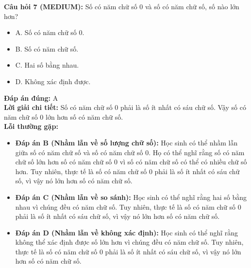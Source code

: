 \documentclass{article}
\begin{document}
\begin{minipage}{\textwidth}
\noindent\textbf{Câu hỏi 7 (MEDIUM):} Số có năm chữ số 0 và số có năm chữ số, số nào lớn hơn? 
\begin{itemize}[label={}]
    \item A. Số có năm chữ số 0.
    \item B. Số có năm chữ số.
    \item C. Hai số bằng nhau.
    \item D. Không xác định được.
\end{itemize}
\textbf{Đáp án đúng:} A \\
\textbf{Lời giải chi tiết:} Số có năm chữ số 0 phải là số ít nhất có sáu chữ số. Vậy số có năm chữ số 0 lớn hơn số có năm chữ số. \\
\textbf{Lỗi thường gặp:}
\begin{itemize}
  \item \textbf{Đáp án B (Nhầm lẫn về số lượng chữ số):} Học sinh có thể nhầm lẫn giữa số có năm chữ số và số có năm chữ số 0. Họ có thể nghĩ rằng số có năm chữ số lớn hơn số có năm chữ số 0 vì số có năm chữ số có thể có nhiều chữ số hơn. Tuy nhiên, thực tế là số có năm chữ số 0 phải là số ít nhất có sáu chữ số, vì vậy nó lớn hơn số có năm chữ số.
  \item \textbf{Đáp án C (Nhầm lẫn về so sánh):} Học sinh có thể nghĩ rằng hai số bằng nhau vì chúng đều có năm chữ số. Tuy nhiên, thực tế là số có năm chữ số 0 phải là số ít nhất có sáu chữ số, vì vậy nó lớn hơn số có năm chữ số.
  \item \textbf{Đáp án D (Nhầm lẫn về không xác định):} Học sinh có thể nghĩ rằng không thể xác định được số lớn hơn vì chúng đều có năm chữ số. Tuy nhiên, thực tế là số có năm chữ số 0 phải là số ít nhất có sáu chữ số, vì vậy nó lớn hơn số có năm chữ số.
\end{itemize}
\end{minipage}
\vspace{1em}
\end{document}
